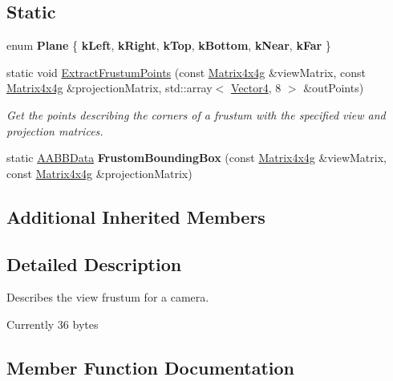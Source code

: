 \subsection*{Static}
\begin{DoxyCompactItemize}
\item 
\mbox{\label{classrev_1_1_frustum_a8a16c0398b66e0fb77f41e10da530138}} 
enum {\bfseries Plane} \{ \newline
{\bfseries k\+Left}, 
{\bfseries k\+Right}, 
{\bfseries k\+Top}, 
{\bfseries k\+Bottom}, 
\newline
{\bfseries k\+Near}, 
{\bfseries k\+Far}
 \}
\item 
static void \mbox{\hyperlink{classrev_1_1_frustum_a09e75a747ac79a6178db2d1dcf44ebc5}{Extract\+Frustum\+Points}} (const \mbox{\hyperlink{classrev_1_1_square_matrix}{Matrix4x4g}} \&view\+Matrix, const \mbox{\hyperlink{classrev_1_1_square_matrix}{Matrix4x4g}} \&projection\+Matrix, std\+::array$<$ \mbox{\hyperlink{classrev_1_1_vector}{Vector4}}, 8 $>$ \&out\+Points)
\begin{DoxyCompactList}\small\item\em Get the points describing the corners of a frustum with the specified view and projection matrices. \end{DoxyCompactList}\item 
\mbox{\label{classrev_1_1_frustum_a00115c1058ea8bc514fcae4313cf802d}} 
static \mbox{\hyperlink{structrev_1_1_a_a_b_b_data}{A\+A\+B\+B\+Data}} {\bfseries Frustom\+Bounding\+Box} (const \mbox{\hyperlink{classrev_1_1_square_matrix}{Matrix4x4g}} \&view\+Matrix, const \mbox{\hyperlink{classrev_1_1_square_matrix}{Matrix4x4g}} \&projection\+Matrix)
\end{DoxyCompactItemize}
\subsection*{Additional Inherited Members}


\subsection{Detailed Description}
Describes the view frustum for a camera. 

Currently 36 bytes 

\subsection{Member Function Documentation}
\mbox{\label{classrev_1_1_frustum_a09e75a747ac79a6178db2d1dcf44ebc5}} 
